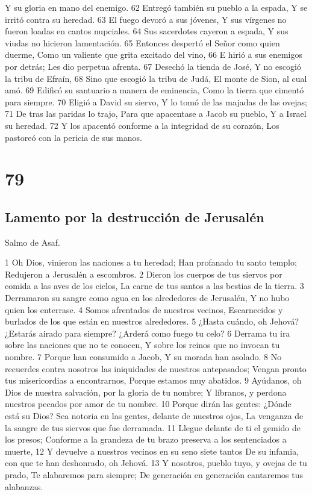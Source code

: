 Y su gloria en mano del enemigo.
62 Entregó también su pueblo a la espada,
Y se irritó contra su heredad.
63 El fuego devoró a sus jóvenes,
Y sus vírgenes no fueron loadas en cantos nupciales.
64 Sus sacerdotes cayeron a espada,
Y sus viudas no hicieron lamentación.
65 Entonces despertó el Señor como quien duerme,
Como un valiente que grita excitado del vino,
66 E hirió a sus enemigos por detrás;
Les dio perpetua afrenta.
67 Desechó la tienda de José,
Y no escogió la tribu de Efraín,
68 Sino que escogió la tribu de Judá,
El monte de Sion, al cual amó.
69 Edificó su santuario a manera de eminencia,
Como la tierra que cimentó para siempre.
70 Eligió a David su siervo,
Y lo tomó de las majadas de las ovejas;
71 De tras las paridas lo trajo,
Para que apacentase a Jacob su pueblo,
Y a Israel su heredad.
72 Y los apacentó conforme a la integridad de su corazón,
Los pastoreó con la pericia de sus manos.

\chapter{79}

\section*{Lamento por la destrucción de Jerusalén}

Salmo de Asaf.

1 Oh Dios, vinieron las naciones a tu heredad;
Han profanado tu santo templo;
Redujeron a Jerusalén a escombros.
2 Dieron los cuerpos de tus siervos por comida a las aves de los cielos,
La carne de tus santos a las bestias de la tierra.
3 Derramaron su sangre como agua en los alrededores de Jerusalén,
Y no hubo quien los enterrase.
4 Somos afrentados de nuestros vecinos,
Escarnecidos y burlados de los que están en nuestros alrededores.
5 ¿Hasta cuándo, oh Jehová? ¿Estarás airado para siempre?
¿Arderá como fuego tu celo?
6 Derrama tu ira sobre las naciones que no te conocen,
Y sobre los reinos que no invocan tu nombre.
7 Porque han consumido a Jacob,
Y su morada han asolado.
8 No recuerdes contra nosotros las iniquidades de nuestros antepasados;
Vengan pronto tus misericordias a encontrarnos,
Porque estamos muy abatidos.
9 Ayúdanos, oh Dios de nuestra salvación, por la gloria de tu nombre;
Y líbranos, y perdona nuestros pecados por amor de tu nombre.
10 Porque dirán las gentes: ¿Dónde está su Dios?
Sea notoria en las gentes, delante de nuestros ojos,
La venganza de la sangre de tus siervos que fue derramada.
11 Llegue delante de ti el gemido de los presos;
Conforme a la grandeza de tu brazo preserva a los sentenciados a muerte,
12 Y devuelve a nuestros vecinos en su seno siete tantos
De su infamia, con que te han deshonrado, oh Jehová.
13 Y nosotros, pueblo tuyo, y ovejas de tu prado,
Te alabaremos para siempre;
De generación en generación cantaremos tus alabanzas.

